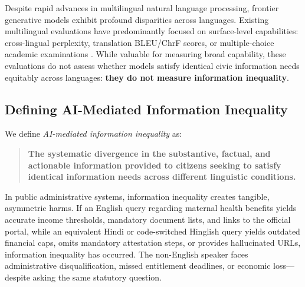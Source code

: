 \documentclass[11pt,a4paper]{article}
\begin{document}
Despite rapid advances in multilingual natural language processing, frontier generative models exhibit profound disparities across languages. Existing multilingual evaluations have predominantly focused on surface-level capabilities: cross-lingual perplexity, translation BLEU/ChrF scores, or multiple-choice academic examinations \cite{hendrycks2021measuring,conneau2018xnli}. While valuable for measuring broad capability, these evaluations do not assess whether models satisfy identical civic information needs equitably across languages: \textbf{they do not measure information inequality}.

\subsection{Defining AI-Mediated Information Inequality}
\label{sec:defining_inequality}

We define \emph{AI-mediated information inequality} as:
\begin{quote}
\textbf{The systematic divergence in the substantive, factual, and actionable information provided to citizens seeking to satisfy identical information needs across different linguistic conditions.}
\end{quote}

In public administrative systems, information inequality creates tangible, asymmetric harms. If an English query regarding maternal health benefits yields accurate income thresholds, mandatory document lists, and links to the official portal, while an equivalent Hindi or code-switched Hinglish query yields outdated financial caps, omits mandatory attestation steps, or provides hallucinated URLs, information inequality has occurred. The non-English speaker faces administrative disqualification, missed entitlement deadlines, or economic loss---despite asking the same statutory question.
\end{document}
